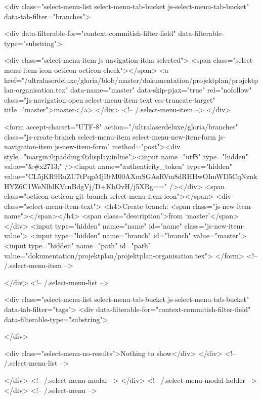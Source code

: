       <div class="select-menu-list select-menu-tab-bucket js-select-menu-tab-bucket" data-tab-filter="branches">

        <div data-filterable-for="context-commitish-filter-field" data-filterable-type="substring">


            <div class="select-menu-item js-navigation-item selected">
              <span class="select-menu-item-icon octicon octicon-check"></span>
              <a href="/ultralaserdeluxe/gloria/blob/master/dokumentation/projektplan/projektplan-organisation.tex"
                 data-name="master"
                 data-skip-pjax="true"
                 rel="nofollow"
                 class="js-navigation-open select-menu-item-text css-truncate-target"
                 title="master">master</a>
            </div> <!-- /.select-menu-item -->
        </div>

          <form accept-charset="UTF-8" action="/ultralaserdeluxe/gloria/branches" class="js-create-branch select-menu-item select-menu-new-item-form js-navigation-item js-new-item-form" method="post"><div style="margin:0;padding:0;display:inline"><input name="utf8" type="hidden" value="&#x2713;" /><input name="authenticity_token" type="hidden" value="CL5jKR9RuZU7tPqpMjBtM00AXmSGAsRVm8dRHHwOImWD5CqNznkHYZ6C1WeNlblKVcnBdgVj/D+KbOvH/j5XRg==" /></div>
            <span class="octicon octicon-git-branch select-menu-item-icon"></span>
            <div class="select-menu-item-text">
              <h4>Create branch: <span class="js-new-item-name"></span></h4>
              <span class="description">from ‘master’</span>
            </div>
            <input type="hidden" name="name" id="name" class="js-new-item-value">
            <input type="hidden" name="branch" id="branch" value="master">
            <input type="hidden" name="path" id="path" value="dokumentation/projektplan/projektplan-organisation.tex">
          </form> <!-- /.select-menu-item -->

      </div> <!-- /.select-menu-list -->

      <div class="select-menu-list select-menu-tab-bucket js-select-menu-tab-bucket" data-tab-filter="tags">
        <div data-filterable-for="context-commitish-filter-field" data-filterable-type="substring">


        </div>

        <div class="select-menu-no-results">Nothing to show</div>
      </div> <!-- /.select-menu-list -->

    </div> <!-- /.select-menu-modal -->
  </div> <!-- /.select-menu-modal-holder -->
</div> <!-- /.select-menu -->

